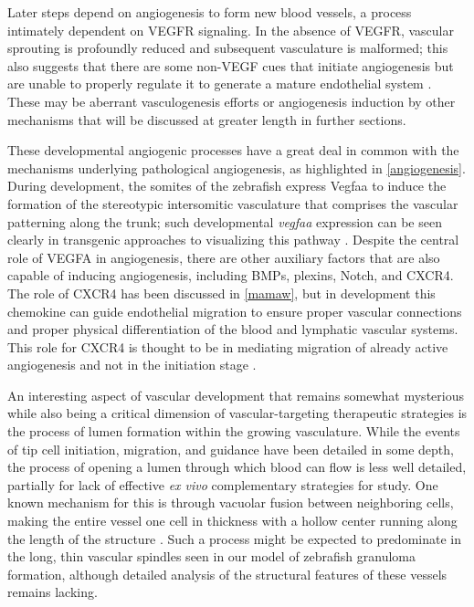 Later steps depend on angiogenesis to form new blood vessels, a process intimately dependent on VEGFR signaling. In the absence of VEGFR, vascular sprouting is profoundly reduced and subsequent vasculature is malformed; this also suggests that there are some non-VEGF cues that initiate angiogenesis but are unable to properly regulate it to generate a mature endothelial system \citep{Hogan2017}. These may be aberrant vasculogenesis efforts or angiogenesis induction by other mechanisms that will be discussed at greater length in further sections.

These developmental angiogenic processes have a great deal in common with the mechanisms underlying pathological angiogenesis, as highlighted in \autoref{angiogenesis}. During development, the somites of the zebrafish express Vegfaa to induce the formation of the stereotypic intersomitic vasculature that comprises the vascular patterning along the trunk; such developmental \textit{vegfaa} expression can be seen clearly in transgenic approaches to visualizing this pathway \citep{Karra2018, Walton2018}. Despite the central role of VEGFA in angiogenesis, there are other auxiliary factors that are also capable of inducing angiogenesis, including BMPs, plexins, Notch, and CXCR4. The role of CXCR4 has been discussed in \autoref{mamaw}, but in development this chemokine can guide endothelial migration to ensure proper vascular connections and proper physical differentiation of the blood and lymphatic vascular systems. This role for CXCR4 is thought to be in mediating migration of already active angiogenesis and not in the initiation stage \citep{Schuermann2014}.

An interesting aspect of vascular development that remains somewhat mysterious while also being a critical dimension of vascular-targeting therapeutic strategies is the process of lumen formation within the growing vasculature. While the events of tip cell initiation, migration, and guidance have been detailed in some depth, the process of opening a lumen through which blood can flow is less well detailed, partially for lack of effective \textit{ex vivo} complementary strategies for study. One known mechanism for this is through vacuolar fusion between neighboring cells, making the entire vessel one cell in thickness with a hollow center running along the length of the structure \citep{Kamei2006}. Such a process might be expected to predominate in the long, thin vascular spindles seen in our model of zebrafish granuloma formation, although detailed analysis of the structural features of these vessels remains lacking.

